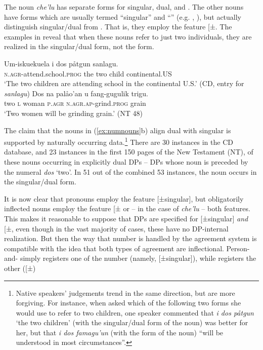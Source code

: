 \documentclass[output=paper,
modfonts
]{LSP/langsci}
\begin{document}
\begin{exe}
\begin{xlist}
The noun \emph{che'lu} has separate forms for singular, dual, and
. The other nouns have forms which are usually termed ``singular''
and ``'' (e.g. \citealt[302--304]{safford1903}, \citealt[325]{topping1973}),
but actually distinguish singular/dual from . That is, they employ
the feature {[}±\isi{plural}{]}. The examples in  reveal that when these
nouns refer to just two individuals, they are realized in the
singular/dual form, not the  form.

\ea \label{ex:chung:16}
\ea \label{ex:chung:16a}
\gll  Um-iskuekuela i dos påtgun sanlagu.\\
\textsc{n.agr-}attend.school.\textsc{prog} the two child continental.US\\
\glt `The two children are attending school in the continental U.S.' (CD,
entry for \emph{sanlagu})
\ex \label{ex:chung:16b} \gll Dos na palåo'an u fang-gugulik trigu.\\
two \textsc{l} woman \textsc{p.agr} \textsc{n.agr.ap-}grind.\textsc{prog} grain\\
\glt `Two women will be grinding grain.' (NT 48)
\z
\z

The claim that the nouns in (\ref{ex:numnouns}b) align dual with singular is supported
by naturally occurring data.\footnote{Native speakers' judgements trend
  in the same direction, but are more forgiving. For instance, when
  asked which of the following two forms she would use to refer to two
  children, one speaker commented that \emph{i dos påtgun} `the two
  children' (with the singular/dual form of the noun) was better for
  her, but that \emph{i dos famagu'un} (with the  form of the
  noun) ``will be understood in most circumstances''.} There are 30
instances in the CD database, and 23 instances in the first 150 pages of
the  New Testament (NT), of these nouns occurring in explicitly
dual DPs -- DPs whose noun is preceded by the numeral \emph{dos} `two'.
In 51 out of the combined 53 instances, the noun occurs in the
singular/dual form.

It is now clear that  pronouns employ the feature
{[}±singular{]}, but obligatorily inflected nouns employ the feature
{[}±\isi{plural}{]} or -- in the case of \emph{che'lu} -- both features. This
makes it reasonable to suppose that  DPs are specified for
{[}±singular{]} \emph{and} {[}±\isi{plural}{]}, even though in the vast
majority of cases, these  have no DP-internal realization. But
then the way that number is handled by the agreement system is
compatible with the idea that both types of agreement are inflectional.
Person-and- simply registers one of the number 
(namely, {[}±singular{]}), while  registers the other
({[}±\isi{plural}{]})


\end{xlist}
\end{exe}
\end{document}
